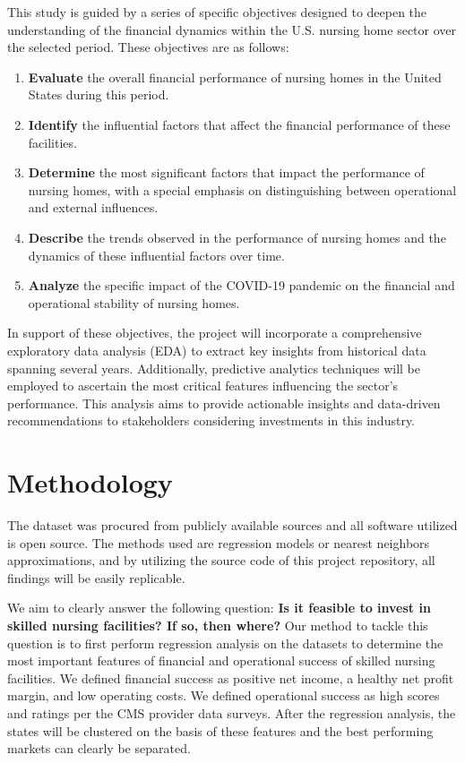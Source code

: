 \documentclass{article}
\theoremstyle{mytheoremstyle}
\theoremstyle{mytheoremstyle}
\theoremstyle{myproblemstyle}
\begin{document}
This study is guided by a series of specific objectives designed to deepen the understanding of the financial dynamics within the U.S. nursing home sector over the selected period. These objectives are as follows:

\begin{enumerate}
    \item \textbf{Evaluate} the overall financial performance of nursing homes in the United States during this period.
    \item \textbf{Identify} the influential factors that affect the financial performance of these facilities.
    \item \textbf{Determine} the most significant factors that impact the performance of nursing homes, with a special emphasis on distinguishing between operational and external influences.
    \item \textbf{Describe} the trends observed in the performance of nursing homes and the dynamics of these influential factors over time.
    \item \textbf{Analyze} the specific impact of the COVID-19 pandemic on the financial and operational stability of nursing homes.
\end{enumerate}

In support of these objectives, the project will incorporate a comprehensive exploratory data analysis (EDA) to extract key insights from historical data spanning several years. Additionally, predictive analytics techniques will be employed to ascertain the most critical features influencing the sector’s performance. This analysis aims to provide actionable insights and data-driven recommendations to stakeholders considering investments in this industry.

\pagebreak
\section{Methodology}

The dataset was procured from publicly available sources and all software utilized is open source. The methods used are regression models or nearest neighbors approximations, and by utilizing the source code of this project repository, all findings will be easily replicable.

We aim to clearly answer the following question: \textbf{Is it feasible to invest in skilled nursing facilities? If so, then where?} Our method to tackle this question is to first perform regression analysis on the datasets to determine the most important features of financial and operational success of skilled nursing facilities. We defined financial success as positive net income, a healthy net profit margin, and low operating costs. We defined operational success as high scores and ratings per the CMS provider data surveys. After the regression analysis, the states will be clustered on the basis of these features and the best performing markets can clearly be separated. 
\end{document}

